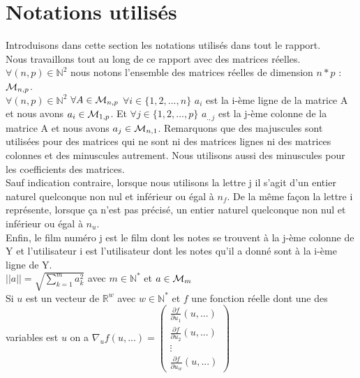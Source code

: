 \documentclass[a4paper,10pt]{article}
\begin{document}
\newpage

\appendix
\section{Notations utilisés}
\label{notations}

Introduisons dans cette section les notations utilisés dans tout le rapport.\\ 

Nous travaillons tout au long de ce rapport avec des matrices réelles. $\forall (n, p) \in \mathbb{N}^2$ nous notons l'ensemble des matrices réelles de dimension $n * p$ : ${\cal M}_{n, p}$.\\ 
$\forall (n, p) \in \mathbb{N}^2$ $\forall A \in {\cal M}_{n, p}$ $\forall i \in \{1, 2, ..., n\}$ $a_i$ est la i-ème ligne de la matrice A et nous avons $a_i \in {\cal M}_{1, p}$. Et $\forall j \in \{1, 2, ..., p\}$ $a_{., j}$ est la j-ème colonne de la matrice A et nous avons $a_j \in {\cal M}_{n, 1}$. Remarquons que des majuscules sont utilisées pour des matrices qui ne sont ni des matrices lignes ni des matrices colonnes et des minuscules autrement. Nous utilisons aussi des minuscules pour les coefficients des matrices.\\ 
Sauf indication contraire, lorsque nous utilisons la lettre j il s'agit d'un entier naturel quelconque non nul et inférieur ou égal à $n_f$. De la même façon la lettre i représente, lorsque ça n'est pas précisé, un entier naturel quelconque non nul et inférieur ou égal à $n_u$.\\ 
Enfin, le film numéro j est le film dont les notes se trouvent à la j-ème colonne de Y et l'utilisateur i est l'utilisateur dont les notes qu'il a donné sont à la i-ème ligne de Y.\\

$||a|| = \sqrt{\sum_{k = 1}^{m} a_{k}^{2}}$ avec $m \in \mathbb{N}^*$ et $a \in {\cal M}_{m}$\\

Si $u$ est un vecteur de $\mathbb{R}^w$ avec $w \in \mathbb{N}^*$ et $f$ une fonction réelle dont une des variables est $u$ on a 
$\nabla_{u} f(u, ...) =
\begin{pmatrix}
\frac{\partial f}{\partial u_{1}}(u, ...)\\
\frac{\partial f}{\partial u_{2}}(u, ...)\\
\vdots\\
\frac{\partial f}{\partial u_{w}}(u, ...)
\end{pmatrix}$
\end{document}
